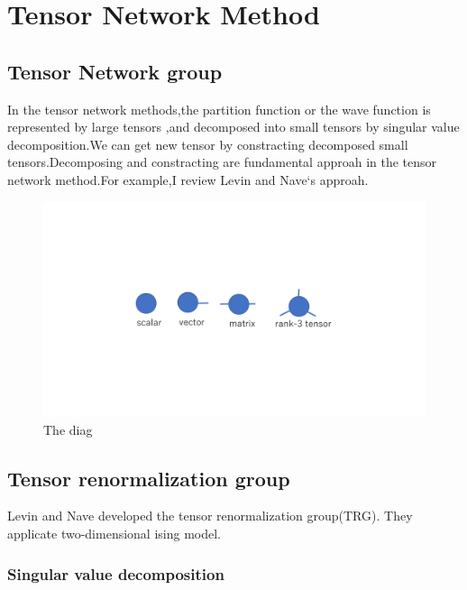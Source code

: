 \chapter{Tensor Network Method}\label{chap:intro_ten}

\section{Tensor Network group}
In the tensor network methods,the partition function or 
the wave function is represented by large tensors ,and decomposed into
small tensors by singular value decomposition.We can get new tensor 
by constracting decomposed small tensors.Decomposing and constracting are
fundamental approah in the tensor network method.For example,I review Levin and Nave`s approah.

\begin{figure}[htb]
\centering
\includegraphics[clip,width=\hsize]{figure/tensor_index.pdf}
\caption{The diag}
\end{figure}

\section{Tensor renormalization group}
Levin and Nave developed the tensor renormalization group(TRG)\cite{Levin-Nave2007}.
They applicate two-dimensional ising model.

\subsection{Singular value decomposition}

